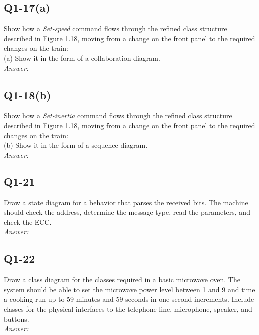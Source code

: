 \documentclass{article}
\begin{document}
\subsection*{ Q1-17(a) }%
Show how a \emph{Set-speed} command flows through the refined class structure described in Figure 1.18, moving from a change on the front panel to the required changes on the train:\\
(a) Show it in the form of a collaboration diagram. 
\\
\emph{Answer:}

\subsection*{ Q1-18(b) }%
Show how a \emph{Set-inertia} command flows through the refined class structure described in Figure 1.18, moving from a change on the front panel to the required changes on the train:\\
(b) Show it in the form of a sequence diagram.
\\
\emph{Answer:}

\subsection*{ Q1-21 }%
Draw a state diagram for a behavior that parses the received bits. The machine should check the address, determine the message type, read the parameters, and check the ECC.
\\
\emph{Answer:}

\subsection*{ Q1-22 }%
Draw a class diagram for the classes required in a basic microwave oven. The system should be able to set the microwave power level between 1 and 9 and time a cooking run up to 59 minutes and 59 seconds in one\--second increments. Include \* classes for the physical interfaces to the telephone line, microphone, speaker, and buttons.  
\\
\emph{Answer:}\\
\end{document}
